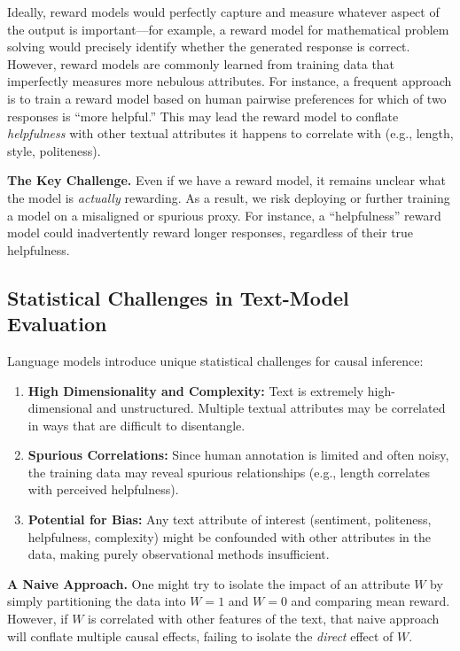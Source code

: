 \documentclass{article}
\theoremstyle{definition}
\begin{document}
Ideally, reward models would perfectly capture and measure whatever aspect of the output is important---for example, a reward model for mathematical problem solving would precisely identify whether the generated response is correct. However, reward models are commonly learned from training data that imperfectly measures more nebulous attributes. For instance, a frequent approach is to train a reward model based on human pairwise preferences for which of two responses is ``more helpful.'' This may lead the reward model to conflate \emph{helpfulness} with other textual attributes it happens to correlate with (e.g., length, style, politeness).

\textbf{The Key Challenge.} Even if we have a reward model, it remains unclear what the model is \emph{actually} rewarding. As a result, we risk deploying or further training a model on a misaligned or spurious proxy. For instance, a ``helpfulness'' reward model could inadvertently reward longer responses, regardless of their true helpfulness.

\subsection{Statistical Challenges in Text-Model Evaluation}
Language models introduce unique statistical challenges for causal inference:
\begin{enumerate}
    \item \textbf{High Dimensionality and Complexity:} Text is extremely high-dimensional and unstructured. Multiple textual attributes may be correlated in ways that are difficult to disentangle.
    \item \textbf{Spurious Correlations:} Since human annotation is limited and often noisy, the training data may reveal spurious relationships (e.g., length correlates with perceived helpfulness).
    \item \textbf{Potential for Bias:} Any text attribute of interest (sentiment, politeness, helpfulness, complexity) might be confounded with other attributes in the data, making purely observational methods insufficient.
\end{enumerate}

\textbf{A Naive Approach.} One might try to isolate the impact of an attribute $W$ by simply partitioning the data into $W=1$ and $W=0$ and comparing mean reward. However, if $W$ is correlated with other features of the text, that naive approach will conflate multiple causal effects, failing to isolate the \emph{direct} effect of $W$.
\end{document}

